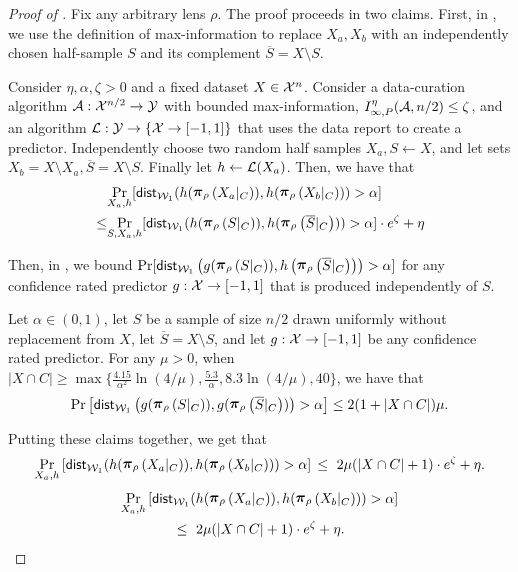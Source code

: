 \begin{proof}[Proof of ]
Fix any arbitrary lens $\rho$. The proof proceeds in two claims. First, in , we use the definition of max-information to replace $X_a,X_b$ with an independently chosen half-sample $S$ and its complement $\overline{S}=X\setminus S$.

\begin{claim}\label{lem:max-info-decouples-Xa-from-ha}
    Consider $\eta,\alpha,\zeta>0$ and a fixed dataset $X \in \mathcal{X}^n$. Consider a data-curation algorithm ${\mathcal{A}:\mathcal{X}^{n/2}\to\mathcal{Y}}$ with bounded max-information, $I^{\eta}_{\infty,P}(\mathcal{A},n/2) \leq \zeta$, and an algorithm $\mathcal{L}: \mathcal{Y} \to \{ \mathcal{X} \to [-1,1] \}$ that uses the data report to create a predictor. Independently choose two random half samples $X_a, S\leftarrow X$, and let sets $X_b = X\setminus X_a, \overline{S} = X\setminus S$. Finally let $h \leftarrow \mathcal{L}(X_a)$. Then, we have that
    \begin{align*}
    &\underset{X_a, h}{\Pr}[\wdist(h(\restrict{X_a\lvert_C}{\rho}), h(\restrict{X_b\lvert_C}{\rho})) > \alpha]\\
    \leq 
    &\underset{S,X_a,h}{\Pr}[\wdist(h(\restrict{S\lvert_C}{\rho}), h(\restrict{\overline{S}\lvert_C}{\rho})) > \alpha]\cdot e^{\zeta} + \eta
    \end{align*}
\end{claim}

\noindent Then, in , we bound $\Pr[\wdist\left(g(\restrict{S\lvert_C}{\rho}),h\left(\restrict{\overline{S}\lvert_C}{\rho}\right)\right) > \alpha]$ for any confidence rated predictor $g:\mathcal{X} \to [-1,1]$ that is produced independently of $S$.
% 
\begin{claim}\label{lem:unrelated-predictor}
Let $\alpha \in (0, 1)$, let $S$ be a sample of size $n/2$ drawn uniformly without replacement from $X$, let $\overline{S} = X\setminus S$,
and let $g:\mathcal{X} \to [-1,1]$ be any confidence rated predictor.
\medskip\noindent
For any $\mu > 0$, when $|X\cap C|\ge \max\{\frac{4.15}{\alpha^2}\ln(4/\mu), \frac{5.3}{\alpha}, 8.3\ln(4/\mu), 40\}$, we have that
$$\Pr\left[\wdist\left(g(\restrict{S\lvert_C}{\rho}),g(\restrict{\overline{S}\lvert_C}{\rho})\right) > \alpha\right] \leq 2(1 + |X \cap C|)\mu.$$ 
\end{claim}

\noindent Putting these claims together, we get that
\ifnum{}
\begin{equation*}
    \underset{X_a, h}{\Pr}\left[\wdist(h(\restrict{X_a\lvert_C}{\rho}), h(\restrict{X_b\lvert_C}{\rho})) > \alpha\right] \,\leq\,\, 2\mu(|X \cap C| +1)\cdot e^\zeta + \eta.
\end{equation*}
\else
\begin{multline*}
    \underset{X_a, h}{\Pr}\left[\wdist(h(\restrict{X_a\lvert_C}{\rho}), h(\restrict{X_b\lvert_C}{\rho})) > \alpha\right] \\
    \,\leq\,\, 2\mu(|X \cap C| +1)\cdot e^\zeta + \eta.
\end{multline*}
\fi


\end{proof}
